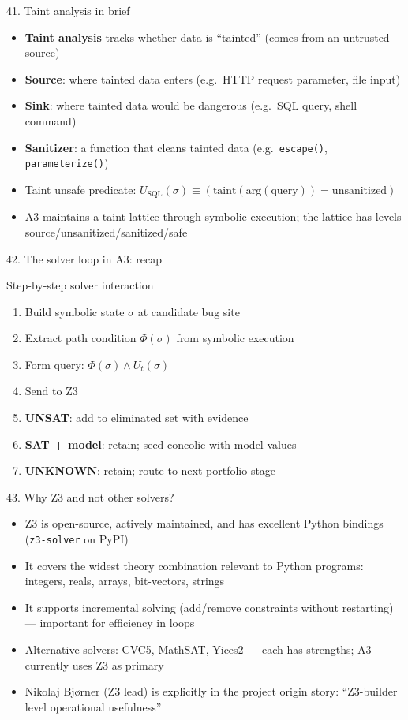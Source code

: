 \documentclass[aspectratio=169]{beamer}
\begin{document}
\begin{frame}{41. Taint analysis in brief}
\begin{itemize}
  \item \textbf{Taint analysis} tracks whether data is ``tainted'' (comes from an untrusted source)
  \item \textbf{Source}: where tainted data enters (e.g.\ HTTP request parameter, file input)
  \item \textbf{Sink}: where tainted data would be dangerous (e.g.\ SQL query, shell command)
  \item \textbf{Sanitizer}: a function that cleans tainted data (e.g.\ \texttt{escape()}, \texttt{parameterize()})
  \item Taint unsafe predicate: \(U_{\text{SQL}}(\sigma) \equiv (\text{taint}(\text{arg}(\text{query})) = \text{unsanitized})\)
  \item A3 maintains a taint lattice through symbolic execution; the lattice has levels source/unsanitized/sanitized/safe
\end{itemize}
\end{frame}

\begin{frame}{42. The solver loop in A3: recap}
\begin{block}{Step-by-step solver interaction}
\begin{enumerate}
  \item Build symbolic state \(\sigma\) at candidate bug site
  \item Extract path condition \(\Phi(\sigma)\) from symbolic execution
  \item Form query: \(\Phi(\sigma) \wedge U_t(\sigma)\)
  \item Send to Z3
  \item \textbf{UNSAT}: add to eliminated set with evidence
  \item \textbf{SAT + model}: retain; seed concolic with model values
  \item \textbf{UNKNOWN}: retain; route to next portfolio stage
\end{enumerate}
\end{block}
\end{frame}

\begin{frame}{43. Why Z3 and not other solvers?}
\begin{itemize}
  \item Z3 is open-source, actively maintained, and has excellent Python bindings (\texttt{z3-solver} on PyPI)
  \item It covers the widest theory combination relevant to Python programs: integers, reals, arrays, bit-vectors, strings
  \item It supports incremental solving (add/remove constraints without restarting) --- important for efficiency in loops
  \item Alternative solvers: CVC5, MathSAT, Yices2 --- each has strengths; A3 currently uses Z3 as primary
  \item Nikolaj Bj\o rner (Z3 lead) is explicitly in the project origin story: ``Z3-builder level operational usefulness''
\end{itemize}
\end{frame}
\end{document}
